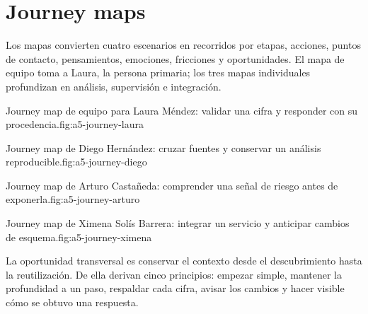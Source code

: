 \section{Journey maps}

Los mapas convierten cuatro escenarios en recorridos por etapas, acciones, puntos de contacto,
pensamientos, emociones, fricciones y oportunidades. El mapa de equipo toma a Laura, la persona
primaria; los tres mapas individuales profundizan en análisis, supervisión e integración.

{Journey map de equipo para Laura Méndez: validar una cifra y responder con su procedencia.}{fig:a5-journey-laura}

{Journey map de Diego Hernández: cruzar fuentes y conservar un análisis reproducible.}{fig:a5-journey-diego}

{Journey map de Arturo Castañeda: comprender una señal de riesgo antes de exponerla.}{fig:a5-journey-arturo}

{Journey map de Ximena Solís Barrera: integrar un servicio y anticipar cambios de esquema.}{fig:a5-journey-ximena}

La oportunidad transversal es conservar el contexto desde el descubrimiento hasta la
reutilización. De ella derivan cinco principios: empezar simple, mantener la profundidad a un
paso, respaldar cada cifra, avisar los cambios y hacer visible cómo se obtuvo una respuesta.

